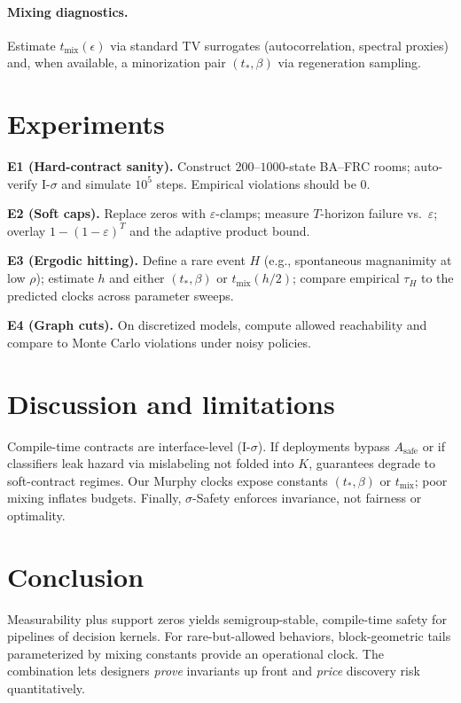 \documentclass[11pt]{article}
\theoremstyle{plain}
\theoremstyle{definition}
\theoremstyle{remark}
\newcommand{\mix}{\mathrm{mix}}
\begin{document}
\paragraph{Mixing diagnostics.}
Estimate $t_{\mix}(\epsilon)$ via standard TV surrogates (autocorrelation, spectral proxies) and, when available, a minorization pair $(t_*,\beta)$ via regeneration sampling.

\section{Experiments}

\noindent\textbf{E1 (Hard-contract sanity).} Construct $200$--$1000$-state BA--FRC rooms; auto-verify I-$\sigma$ and simulate $10^5$ steps. Empirical violations should be $0$.

\noindent\textbf{E2 (Soft caps).} Replace zeros with $\varepsilon$-clamps; measure $T$-horizon failure vs.\ $\varepsilon$; overlay $1-(1-\varepsilon)^T$ and the adaptive product bound.

\noindent\textbf{E3 (Ergodic hitting).} Define a rare event $H$ (e.g., spontaneous magnanimity at low $\rho$); estimate $h$ and either $(t_*,\beta)$ or $t_{\mix}(h/2)$; compare empirical $\tau_H$ to the predicted clocks across parameter sweeps.

\noindent\textbf{E4 (Graph cuts).} On discretized models, compute allowed reachability and compare to Monte Carlo violations under noisy policies.

\section{Discussion and limitations}

Compile-time contracts are interface-level (I-$\sigma$). If deployments bypass $A_{\mathrm{safe}}$ or if classifiers leak hazard via mislabeling not folded into $K$, guarantees degrade to soft-contract regimes. Our Murphy clocks expose constants $(t_*,\beta)$ or $t_{\mix}$; poor mixing inflates budgets. Finally, $\sigma$-Safety enforces invariance, not fairness or optimality.

\section{Conclusion}

Measurability plus support zeros yields semigroup-stable, compile-time safety for pipelines of decision kernels. For rare-but-allowed behaviors, block-geometric tails parameterized by mixing constants provide an operational clock. The combination lets designers \emph{prove} invariants up front and \emph{price} discovery risk quantitatively.
\end{document}
